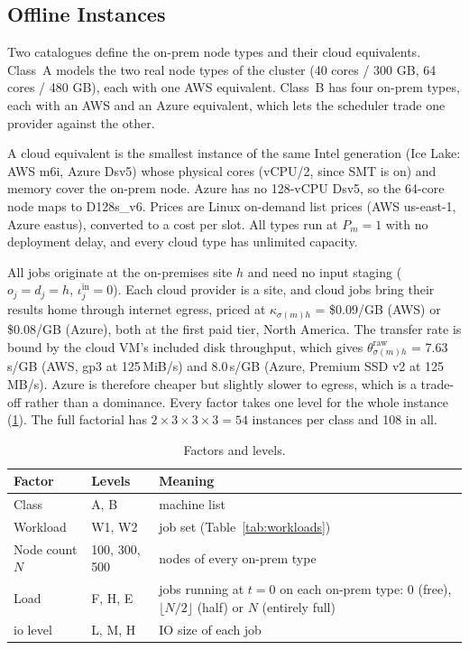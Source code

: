 \documentclass[conference]{IEEEtran}
\begin{document}
\subsection{Offline Instances}

Two catalogues define the on-prem node types and their cloud equivalents. Class~A models the two real node types of the
cluster (40 cores / 300 GB,  64 cores / 480 GB), each with one AWS
equivalent. Class~B has four on-prem types, each with an AWS and an Azure
equivalent, which lets the scheduler trade one provider against the other.

A cloud equivalent is the smallest instance of the same Intel generation (Ice
Lake: AWS m6i, Azure Dsv5) whose physical cores (vCPU/2, since SMT is on) and
memory cover the on-prem node. Azure has no 128-vCPU Dsv5, so the 64-core node maps
to D128s\_v6. Prices are Linux on-demand list prices (AWS us-east-1, Azure eastus), converted to a cost per slot. All types run at $P_m=1$ with no
deployment delay, and every cloud type has unlimited capacity.

All jobs originate at the on-premises site $h$ and need no input staging ($o_j=d_j=h$, $\iota_j^{\mathrm{in}}=0$). Each cloud provider is a site, and cloud jobs bring their results home through internet egress, priced at
$\kappa_{\sigma(m)h}$ = \$0.09/GB (AWS) or \$0.08/GB (Azure),
both at the first paid tier, North America. The transfer rate is bound by the cloud VM's included disk throughput, which gives $\theta_{\sigma(m)h}^{\mathrm{raw}}$ = 7.63\,s/GB (AWS, gp3 at 125\,MiB/s) and 8.0\,s/GB (Azure, Premium SSD v2 at
125\,MB/s). Azure is therefore cheaper but slightly slower to egress, which is a trade-off rather than a dominance.
Every factor takes one level for the whole instance (\ref{tab:factors}). The
full factorial has $2\times3\times3\times3=54$ instances per class and 108 in all.

\begin{table}[ht]
\centering\small
\caption{Factors and levels.}
\label{tab:factors}
\begin{tabularx}{\linewidth}{llX}
\toprule
Factor & Levels & Meaning \\
\midrule
Class & A, B & machine list\\
Workload & W1, W2 & job set (Table~\ref{tab:workloads}) \\
Node count $N$ & 100, 300, 500 & nodes of every on-prem type \\
Load & F, H, E & jobs running at $t=0$ on each on-prem type: 0 (free),
  $\lfloor N/2\rfloor$ (half) or $N$ (entirely full) \\
io level & L, M, H & IO size of each job \\
\bottomrule
\end{tabularx}
\end{table}
\end{document}
